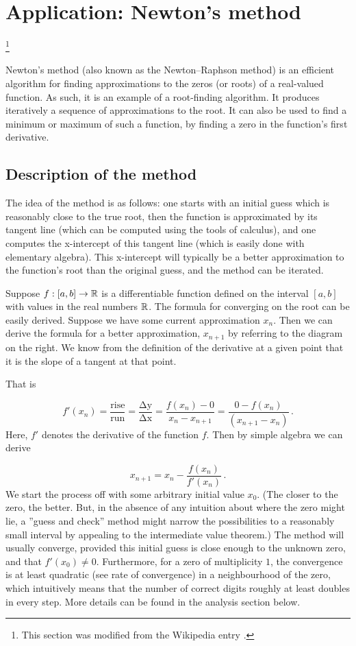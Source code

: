  
\section{Application: Newton's method}\footnote{This section was 
modified from the Wikipedia entry \cite{N}.}
\label{sec:newtons-method}

Newton's method (also known as the Newton–Raphson method) is an 
efficient algorithm for finding approximations to the zeros (or roots) 
of a real-valued function. As such, it is an example of a root-finding 
algorithm. It produces iteratively a sequence of approximations to the 
root. It can also be used to find a minimum or maximum of such a 
function, by finding a zero in the function's first derivative.


\subsection{Description of the method}

The idea of the method is as follows: one starts with an initial 
guess which is reasonably close to the true root, then the function 
is approximated by its tangent line (which can be computed using 
the tools of calculus), and one computes the x-intercept of this 
tangent line (which is easily done with elementary algebra). 
This x-intercept will typically be a better approximation to 
the function's root than the original guess, and the method can be 
iterated.

Suppose $f : [a, b] \to \mathbb{R}$ is a differentiable function defined 
on the interval $[a, b]$ with values in the real numbers $\mathbb{R}$. The 
formula for converging on the root can be easily derived. 
Suppose we have some current approximation $x_n$. Then we can derive 
the formula for a better approximation, $x_{n+1}$ by referring to 
the diagram on the right. We know from the definition of the 
derivative at a given point that it is the slope of a tangent at that point.

That is

\[
    f'(x_{n}) 
= \frac{ \mathrm{rise} }{ \mathrm{run} } 
= \frac{ \mathrm{\Delta y} }{ \mathrm{\Delta x} } 
= \frac{ f( x_{n} ) - 0 }{ x_{n} - x_{n+1} } 
= \frac{0 - f(x_{n})}{(x_{n+1} - x_{n})}\,\!.
\]
Here, $f'$ denotes the derivative of the function $f$. Then by 
simple algebra we can derive

\[
    x_{n+1} = x_n - \frac{f(x_n)}{f'(x_n)}\,\!. 
\]
We start the process off with some arbitrary initial value $x_0$. 
(The closer to the zero, the better. But, in the absence of any 
intuition about where the zero might lie, a ''guess and check'' 
method might narrow the possibilities to a reasonably small 
interval by appealing to the intermediate value theorem.) The 
method will usually converge, provided this initial guess is close 
enough to the unknown zero, and that $f'(x_0) \neq 0$. Furthermore, 
for a zero of multiplicity $1$, the convergence is at least 
quadratic (see rate of convergence) in a neighbourhood of the 
zero, which intuitively means that the number of correct digits 
roughly at least doubles in every step. More details can be found 
in the analysis section below.

